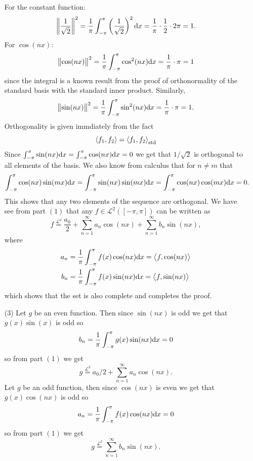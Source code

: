 \documentclass[11pt,a4paper]{article}
\begin{document}
\begin{solution}
\begin{enumerate}
      For the constant function:
      \[
        \norm{\frac{1}{\sqrt{2}}}^2 =
        \frac{1}{\pi} \int_{-\pi}^{\pi} \del{\frac{1}{\sqrt{2}}}^2 \dx =
        \frac{1}{\pi} \cdot \half \cdot 2\pi = 1.
      \]
      For $\cos(nx):$
      \[
        \norm{\cos(nx)}^2 =
        \frac{1}{\pi} \int_{-\pi}^{\pi} \cos^2(nx) \dx =
        \frac{1}{\pi} \cdot \pi = 1
      \]
      since the integral is a known result from the proof of orthonormality
      of the standard basis with the standard inner product.
      Similarly,
      \[
        \norm{\sin(nx)}^2 =
        \frac{1}{\pi} \int_{-\pi}^{\pi} \sin^2(nx) \dx =
        \frac{1}{\pi} \cdot \pi = 1.
      \]
      Orthogonality is given immdiately from the fact
      \[
        \ip{f_1}{f_2} = \ip{f_1}{f_2}_{\std}
      \]
      Since
      $\int_{-\pi}^{\pi} \sin(nx) \dx = \int_{-\pi}^{\pi} \cos(nx) \dx = 0$
      we get that $1/\sqrt{2}$ is orthogonal to all elements of the basis.
      We also know from calculus that for $n \neq m$ that
      \[
        \int_{-\pi}^{\pi} \cos(nx) \sin(mx) \dx =
        \int_{-\pi}^{\pi} \sin(nx) \sin(mx) \dx =
        \int_{-\pi}^{\pi} \cos(nx) \cos(mx) \dx = 0.
      \]
      This shows that any two elements of the sequence are orthogonal.
      We have see from part $(1)$ that any $f \in \mathcal L^2([-\pi,\pi])$
      can be written as
      \[
        f \overset{\mathcal L^2}{=}
        \frac{a_0}{2} +
        \sum_{n=1}^{\infty} a_n \cos(nx) + \sum_{n=1}^{\infty} b_n \sin(nx),
      \]
      where
      \begin{align*}
        a_n &= \frac{1}{\pi} \int_{-\pi}^{\pi} f(x) \cos(nx) \dx =
        \ip{f}{\cos(nx)} \\
        b_n &= \frac{1}{\pi} \int_{-\pi}^{\pi} f(x) \sin(nx) \dx =
        \ip{f}{\sin(nx)}
      \end{align*}
      which shows that the set is also complete and completes the proof.
    \item[(3)] Let $g$ be an even function.
      Then since $\sin(nx)$ is odd we get that $g(x) \sin(x)$ is odd so
      \[
        b_n = \frac{1}{\pi} \int_{-\pi}^{\pi} g(x) \sin(nx) \dx = 0
      \]
      so from part $(1)$ we get
      \[
        g \overset{\mathcal L^2}{=} a_0/2 + \sum_{n=1}^{\infty} a_n \cos(nx).
      \]
      Let $g$ be an odd function, then since $\cos(nx)$ is even we
      get that $g(x) \cos(nx)$ is odd so
      \[
        a_n = \frac{1}{\pi} \int_{-\pi}^{\pi} f(x) \cos(nx) \dx = 0
      \]
      so from part $(1)$ we get
      \[
        g \overset{\mathcal L^2}{=} \sum_{n=1}^{\infty} b_n \sin(nx).
\]
\end{enumerate}
\end{solution}
\end{document}
